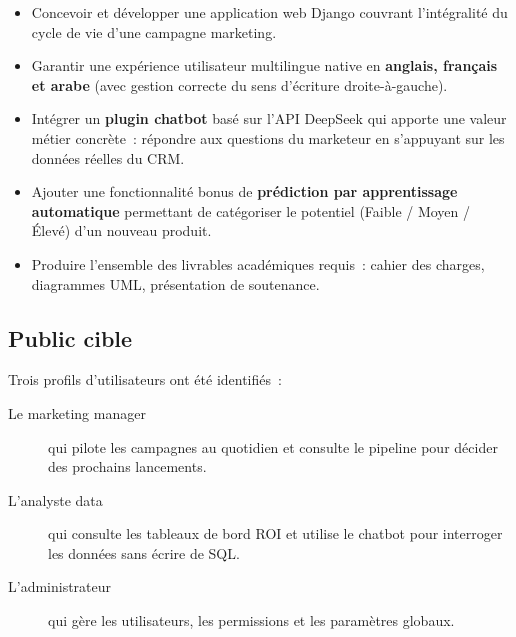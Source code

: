 \begin{itemize}
    \item Concevoir et développer une application web Django couvrant
    l'intégralité du cycle de vie d'une campagne marketing.
    \item Garantir une expérience utilisateur multilingue native en
    \textbf{anglais, français et arabe} (avec gestion correcte du sens
    d'écriture droite-à-gauche).
    \item Intégrer un \textbf{plugin chatbot} basé sur l'API DeepSeek qui
    apporte une valeur métier concrète~: répondre aux questions du marketeur
    en s'appuyant sur les données réelles du CRM.
    \item Ajouter une fonctionnalité bonus de \textbf{prédiction par
    apprentissage automatique} permettant de catégoriser le potentiel
    (Faible / Moyen / Élevé) d'un nouveau produit.
    \item Produire l'ensemble des livrables académiques requis~: cahier des
    charges, diagrammes UML, présentation de soutenance.
\end{itemize}

\subsection{Public cible}

Trois profils d'utilisateurs ont été identifiés~:
\begin{description}
    \item[Le marketing manager] qui pilote les campagnes au quotidien et
    consulte le pipeline pour décider des prochains lancements.
    \item[L'analyste data] qui consulte les tableaux de bord ROI et utilise
    le chatbot pour interroger les données sans écrire de SQL.
    \item[L'administrateur] qui gère les utilisateurs, les permissions et
    les paramètres globaux.
\end{description}
